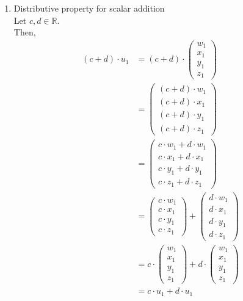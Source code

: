 \documentclass[12pt,letterpaper,fleqn]{article}
\theoremstyle{definition}
\begin{document}
\begin{enumerate}
\item Distributive property for scalar addition\\
Let $c,d \in \mathbb{R}$.\\
Then,
\begin{equation*}
\begin{split}
(c + d)\cdot u_1 &= (c + d) \cdot \begin{pmatrix}
w_1\\
x_1\\
y_1\\
z_1
\end{pmatrix}\\
&= \begin{pmatrix}
(c + d)\cdot w_1\\
(c + d)\cdot x_1\\
(c + d)\cdot y_1\\
(c + d)\cdot z_1
\end{pmatrix}\\
&= \begin{pmatrix}
c \cdot w_1 + d \cdot w_1\\
c \cdot x_1 + d \cdot x_1\\
c \cdot y_1 + d \cdot y_1\\
c \cdot z_1 + d \cdot z_1
\end{pmatrix}\\
&= \begin{pmatrix}
c \cdot w_1\\
c \cdot x_1\\
c \cdot y_1\\
c \cdot z_1
\end{pmatrix} +
\begin{pmatrix}
d \cdot w_1\\
d \cdot x_1\\
d \cdot y_1\\
d \cdot z_1
\end{pmatrix}\\
&= c \cdot \begin{pmatrix}
w_1\\
x_1\\
y_1\\
z_1
\end{pmatrix} +
d \cdot \begin{pmatrix}
w_1\\
x_1\\
y_1\\
z_1
\end{pmatrix}\\
&= c \cdot u_1 + d \cdot u_1
\end{split}

\end{equation*}
\end{enumerate}
\end{document}
